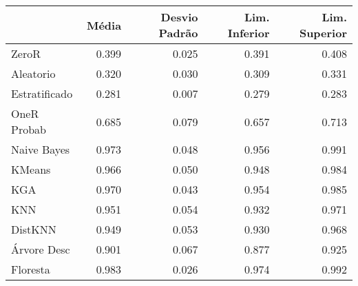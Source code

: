 \begin{table}
\centering
\label{Wine_status_table}
\begin{tabular}{lrrrr}
\toprule
{} & Média & Desvio Padrão & Lim. Inferior & Lim. Superior \\
\midrule
ZeroR         & 0.399 &         0.025 &         0.391 &         0.408 \\
Aleatorio     & 0.320 &         0.030 &         0.309 &         0.331 \\
Estratificado & 0.281 &         0.007 &         0.279 &         0.283 \\
OneR Probab   & 0.685 &         0.079 &         0.657 &         0.713 \\
Naive Bayes   & 0.973 &         0.048 &         0.956 &         0.991 \\
KMeans        & 0.966 &         0.050 &         0.948 &         0.984 \\
KGA           & 0.970 &         0.043 &         0.954 &         0.985 \\
KNN           & 0.951 &         0.054 &         0.932 &         0.971 \\
DistKNN       & 0.949 &         0.053 &         0.930 &         0.968 \\
Árvore Desc   & 0.901 &         0.067 &         0.877 &         0.925 \\
Floresta      & 0.983 &         0.026 &         0.974 &         0.992 \\
\bottomrule
\end{tabular}
\end{table}
